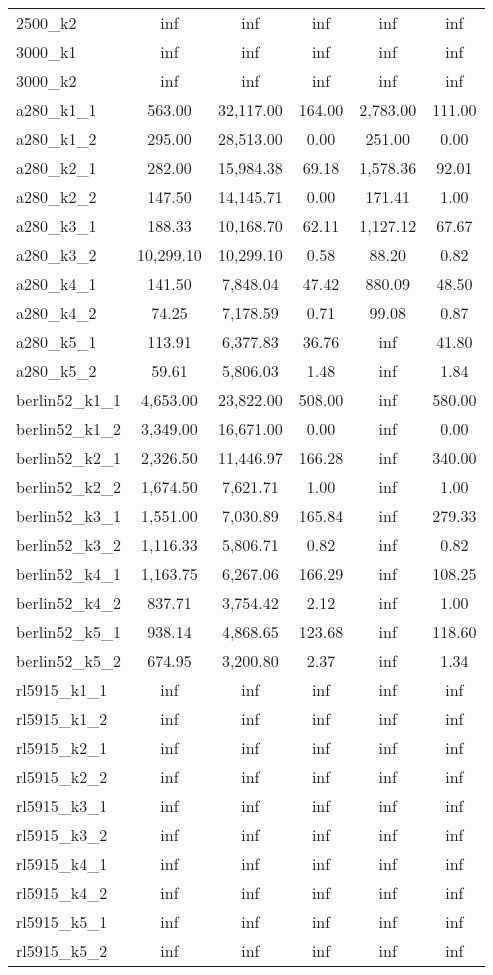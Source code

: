 \documentclass{article}
\begin{document}
\begin{center}
\begin{tabular}{|l|c|c|c|c|c|}
2500\_k2 & inf & inf & inf & inf & inf \\
3000\_k1 & inf & inf & inf & inf & inf \\
3000\_k2 & inf & inf & inf & inf & inf \\
a280\_k1\_1 & 563.00 & 32,117.00 & 164.00 & 2,783.00 & 111.00 \\
a280\_k1\_2 & 295.00 & 28,513.00 & 0.00 & 251.00 & 0.00 \\
a280\_k2\_1 & 282.00 & 15,984.38 & 69.18 & 1,578.36 & 92.01 \\
a280\_k2\_2 & 147.50 & 14,145.71 & 0.00 & 171.41 & 1.00 \\
a280\_k3\_1 & 188.33 & 10,168.70 & 62.11 & 1,127.12 & 67.67 \\
a280\_k3\_2 & 10,299.10 & 10,299.10 & 0.58 & 88.20 & 0.82 \\
a280\_k4\_1 & 141.50 & 7,848.04 & 47.42 & 880.09 & 48.50 \\
a280\_k4\_2 & 74.25 & 7,178.59 & 0.71 & 99.08 & 0.87 \\
a280\_k5\_1 & 113.91 & 6,377.83 & 36.76 & inf & 41.80 \\
a280\_k5\_2 & 59.61 & 5,806.03 & 1.48 & inf & 1.84 \\
berlin52\_k1\_1 & 4,653.00 & 23,822.00 & 508.00 & inf & 580.00 \\
berlin52\_k1\_2 & 3,349.00 & 16,671.00 & 0.00 & inf & 0.00 \\
berlin52\_k2\_1 & 2,326.50 & 11,446.97 & 166.28 & inf & 340.00 \\
berlin52\_k2\_2 & 1,674.50 & 7,621.71 & 1.00 & inf & 1.00 \\
berlin52\_k3\_1 & 1,551.00 & 7,030.89 & 165.84 & inf & 279.33 \\
berlin52\_k3\_2 & 1,116.33 & 5,806.71 & 0.82 & inf & 0.82 \\
berlin52\_k4\_1 & 1,163.75 & 6,267.06 & 166.29 & inf & 108.25 \\
berlin52\_k4\_2 & 837.71 & 3,754.42 & 2.12 & inf & 1.00 \\
berlin52\_k5\_1 & 938.14 & 4,868.65 & 123.68 & inf & 118.60 \\
berlin52\_k5\_2 & 674.95 & 3,200.80 & 2.37 & inf & 1.34 \\
rl5915\_k1\_1 & inf & inf & inf & inf & inf \\
rl5915\_k1\_2 & inf & inf & inf & inf & inf \\
rl5915\_k2\_1 & inf & inf & inf & inf & inf \\
rl5915\_k2\_2 & inf & inf & inf & inf & inf \\
rl5915\_k3\_1 & inf & inf & inf & inf & inf \\
rl5915\_k3\_2 & inf & inf & inf & inf & inf \\
rl5915\_k4\_1 & inf & inf & inf & inf & inf \\
rl5915\_k4\_2 & inf & inf & inf & inf & inf \\
rl5915\_k5\_1 & inf & inf & inf & inf & inf \\
rl5915\_k5\_2 & inf & inf & inf & inf & inf \\
\hline
\end{tabular}
\end{center}
\end{document}
